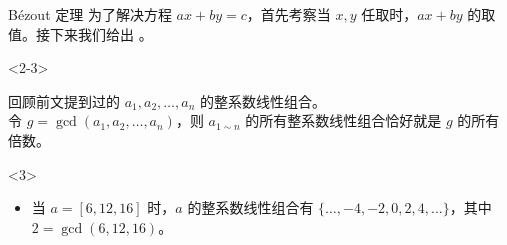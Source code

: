 \documentclass{../pkslide}
\begin{document}
\begin{frame}{Bézout 定理}
  为了解决方程 $a x + b y = c$，首先考察当 $x, y$ 任取时，$a x + b y$ 的取值。接下来我们给出 。
  
  \begin{visibleenv}<2-3>
    \begin{theorem}[Bézout 定理]
      回顾前文提到过的 $a_1, a_2, \ldots, a_n$ 的整系数线性组合。\\
      令 $g = \gcd(a_1, a_2, \ldots, a_n)$，则 $a_{1 \sim n}$ 的所有整系数线性组合恰好就是 $g$ 的所有倍数。
    \end{theorem}
  \end{visibleenv}
  
  \begin{visibleenv}<3>
    \begin{examples}[Bézout 定理]
      \begin{itemize}
        \item 当 $a = [ 6, 12, 16 ]$ 时，$a$ 的整系数线性组合有 $\{ \ldots, -4, -2, 0, 2, 4, \ldots \}$，其中 $2 = \gcd(6, 12, 16)$。
      \end{itemize}
    \end{examples}
  \end{visibleenv}
\end{frame}
\end{document}
